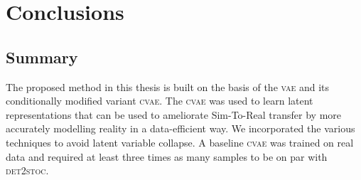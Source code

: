 \documentclass{kththesis}
\newcommand{\vae}{\textsc{vae}}
\newcommand{\cvae}{\textsc{cvae}}
\newcommand{\dettostoc}{\textsc{det2stoc}}
\begin{document}

\chapter{Conclusions}
\label{conclusions}

\section{Summary}

The proposed method in this thesis is built on the basis of the \vae{} and its conditionally modified variant \cvae{}. The \cvae{} was used to learn latent representations that can be used to ameliorate Sim-To-Real transfer by more accurately modelling reality in a data-efficient way. We incorporated the various techniques to avoid latent variable collapse. A baseline \cvae{} was trained on real data and required at least three times as many samples to be on par with \dettostoc{}.
\end{document}
